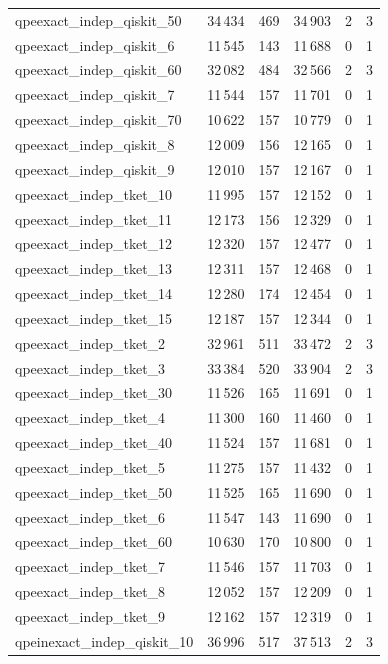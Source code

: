 \begin{longtable}{lrrrrr}
qpeexact\_indep\_qiskit\_50 & 34\,434 & 469 & 34\,903 & 2 & 3 \\
qpeexact\_indep\_qiskit\_6 & 11\,545 & 143 & 11\,688 & 0 & 1 \\
qpeexact\_indep\_qiskit\_60 & 32\,082 & 484 & 32\,566 & 2 & 3 \\
qpeexact\_indep\_qiskit\_7 & 11\,544 & 157 & 11\,701 & 0 & 1 \\
qpeexact\_indep\_qiskit\_70 & 10\,622 & 157 & 10\,779 & 0 & 1 \\
qpeexact\_indep\_qiskit\_8 & 12\,009 & 156 & 12\,165 & 0 & 1 \\
qpeexact\_indep\_qiskit\_9 & 12\,010 & 157 & 12\,167 & 0 & 1 \\
qpeexact\_indep\_tket\_10 & 11\,995 & 157 & 12\,152 & 0 & 1 \\
qpeexact\_indep\_tket\_11 & 12\,173 & 156 & 12\,329 & 0 & 1 \\
qpeexact\_indep\_tket\_12 & 12\,320 & 157 & 12\,477 & 0 & 1 \\
qpeexact\_indep\_tket\_13 & 12\,311 & 157 & 12\,468 & 0 & 1 \\
qpeexact\_indep\_tket\_14 & 12\,280 & 174 & 12\,454 & 0 & 1 \\
qpeexact\_indep\_tket\_15 & 12\,187 & 157 & 12\,344 & 0 & 1 \\
qpeexact\_indep\_tket\_2 & 32\,961 & 511 & 33\,472 & 2 & 3 \\
qpeexact\_indep\_tket\_3 & 33\,384 & 520 & 33\,904 & 2 & 3 \\
qpeexact\_indep\_tket\_30 & 11\,526 & 165 & 11\,691 & 0 & 1 \\
qpeexact\_indep\_tket\_4 & 11\,300 & 160 & 11\,460 & 0 & 1 \\
qpeexact\_indep\_tket\_40 & 11\,524 & 157 & 11\,681 & 0 & 1 \\
qpeexact\_indep\_tket\_5 & 11\,275 & 157 & 11\,432 & 0 & 1 \\
qpeexact\_indep\_tket\_50 & 11\,525 & 165 & 11\,690 & 0 & 1 \\
qpeexact\_indep\_tket\_6 & 11\,547 & 143 & 11\,690 & 0 & 1 \\
qpeexact\_indep\_tket\_60 & 10\,630 & 170 & 10\,800 & 0 & 1 \\
qpeexact\_indep\_tket\_7 & 11\,546 & 157 & 11\,703 & 0 & 1 \\
qpeexact\_indep\_tket\_8 & 12\,052 & 157 & 12\,209 & 0 & 1 \\
qpeexact\_indep\_tket\_9 & 12\,162 & 157 & 12\,319 & 0 & 1 \\
qpeinexact\_indep\_qiskit\_10 & 36\,996 & 517 & 37\,513 & 2 & 3 \\

\end{longtable}
